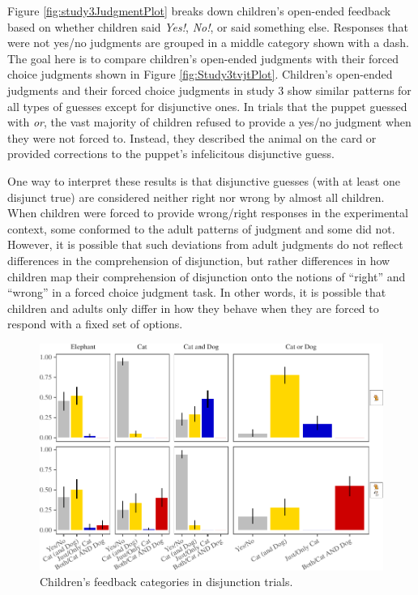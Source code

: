 \documentclass[floatsintext,man]{apa6}
\theoremstyle{definition}
\theoremstyle{definition}
\theoremstyle{definition}
\theoremstyle{remark}
\begin{document}
Figure \ref{fig:study3JudgmentPlot} breaks down children's open-ended
feedback based on whether children said \emph{Yes!}, \emph{No!}, or said
something else. Responses that were not yes/no judgments are grouped in
a middle category shown with a dash. The goal here is to compare
children's open-ended judgments with their forced choice judgments shown
in Figure \ref{fig:Study3tvjtPlot}. Children's open-ended judgments and
their forced choice judgments in study 3 show similar patterns for all
types of guesses except for disjunctive ones. In trials that the puppet
guessed with \emph{or}, the vast majority of children refused to provide
a yes/no judgment when they were not forced to. Instead, they described
the animal on the card or provided corrections to the puppet's
infelicitous disjunctive guess.

One way to interpret these results is that disjunctive guesses (with at
least one disjunct true) are considered neither right nor wrong by
almost all children. When children were forced to provide wrong/right
responses in the experimental context, some conformed to the adult
patterns of judgment and some did not. However, it is possible that such
deviations from adult judgments do not reflect differences in the
comprehension of disjunction, but rather differences in how children map
their comprehension of disjunction onto the notions of \enquote{right}
and \enquote{wrong} in a forced choice judgment task. In other words, it
is possible that children and adults only differ in how they behave when
they are forced to respond with a fixed set of options.

\begin{figure}
\centering
\includegraphics{figs/correctivePlot-1.pdf}
\caption{\label{fig:correctivePlot}Children's feedback categories in
disjunction trials.}
\end{figure}
\end{document}
